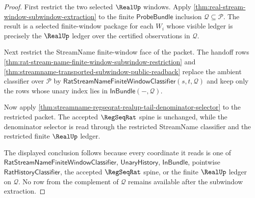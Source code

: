 \begin{proof}
First restrict the two selected $\RealUp$ windows. Apply
\autoref{thm:real-stream-window-subwindow-extraction} to the finite
$\mathsf{ProbeBundle}$ inclusion $\mathcal Q\subseteq\mathcal P$. The result is
a selected finite-window package for each $W_i$ whose visible ledger is precisely
the $\RealUp$ ledger over the certified observations in $\mathcal Q$.

Next restrict the StreamName finite-window face of the packet. The handoff rows
\autoref{thm:rat-stream-name-finite-window-subwindow-restriction} and
\autoref{thm:streamname-transported-subwindow-public-readback} replace the
ambient classifier over $\mathcal P$ by
$\mathsf{RatStreamNameFiniteWindowClassifier}(s,t,\mathcal Q)$ and keep only the
rows whose unary index lies in $\mathsf{InBundle}(-,\mathcal Q)$.

Now apply
\autoref{thm:streamname-regseqrat-realup-tail-denominator-selector} to the
restricted packet. The accepted $\RegSeqRat$ spine is unchanged, while the
denominator selector is read through the restricted StreamName classifier and
the restricted finite $\RealUp$ ledger.

The displayed conclusion follows because every coordinate it reads is one of
$\mathsf{RatStreamNameFiniteWindowClassifier}$, $\mathsf{UnaryHistory}$,
$\mathsf{InBundle}$, pointwise $\mathsf{RatHistoryClassifier}$, the accepted
$\RegSeqRat$ spine, or the finite $\RealUp$ ledger on $\mathcal Q$. No row from
the complement of $\mathcal Q$ remains available after the subwindow extraction.
\end{proof}

